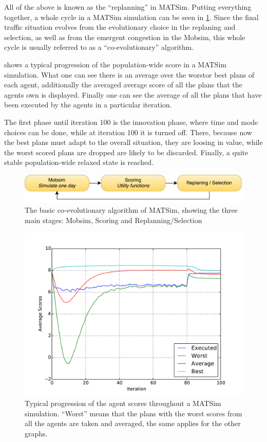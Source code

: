 All of the above is known as the ``replanning'' in MATSim. Putting everything
together, a whole cycle in a MATSim simulation can be seen in \cref{fig:matsimcycle}. Since the
final traffic situation evolves from the evolutionary choice in the replaning and
selection, as well as from the emergent congestion in the Mobsim, this whole
cycle is usually referred to as a ``co-evolutionary'' algorithm.

 shows a typical progression of the population-wide score in
a MATSim simulation. What one can see there is an average over the worstor best plans
of each agent, additionally the averaged average score of all the plans that the agents
own is displayed. Finally one can see the average of all the plans that have been executed
by the agents in a particular iteration.

The first phase until iteration 100 is the innovation phase, where time and mode
choices can be done, while at iteration 100 it is turned off. There, because now
the best plans must adapt to the overall situation, they are loosing in value,
while the worst scored plans are dropped are likely to be discarded. Finally,
a quite stable population-wide relaxed state is reached.

\begin{figure}
    \centering
    \includegraphics[width=1.0\textwidth]{figures/matsimcycle.pdf}
    \caption{The basic co-evolutionary algorithm of MATSim, showing the three main
    stages: Mobsim, Scoring and Replanning/Selection}
    \label{fig:matsimcycle}
\end{figure}

\begin{figure}
    \centering
    \includegraphics[width=1.0\textwidth]{figures/scorestats.pdf}
    \caption{Typical progression of the agent scores throughout a MATSim simulation.
    ``Worst'' means that the plans with the worst scores from all the agents are taken
    and averaged, the same applies for the other graphs. }
    \label{fig:scorestats}
\end{figure}

